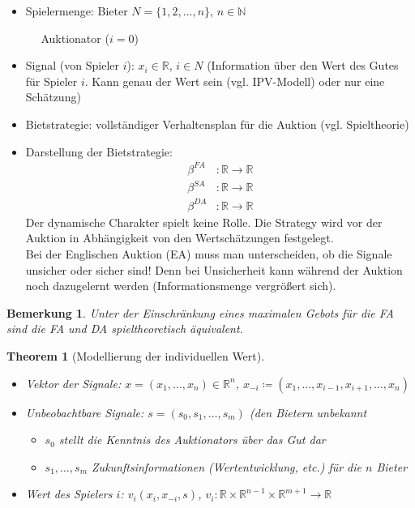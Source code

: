 \documentclass[12pt]{extreport} %
\theoremstyle{named}
\newtheorem{unnamedtheorem}{Theorem} \counterwithin{unnamedtheorem}{chapter}
\theoremstyle{nnamed}
\theoremstyle{itshape}
\theoremstyle{normal}
\newtheorem*{bemerkung}{Bemerkung}
\begin{document}
\begin{itemize}
	\item Spielermenge: Bieter $N = \{1, 2, \dotsc, n \}$, $n \in \mathbb{N}$
	
		~\hspace{2.3cm}~ Auktionator ($i = 0$)
	\item Signal (von Spieler $i$): $x_{i} \in \mathbb{R}$, $i \in N$ (Information über den Wert des Gutes für Spieler $i$. Kann genau der Wert sein (vgl. IPV-Modell) oder nur eine Schätzung)
	\item Bietstrategie: vollständiger Verhaltensplan für die Auktion (vgl. Spieltheorie)
	\item Darstellung der Bietstrategie:
		\begin{align*}
			\beta^{FA} & \colon \mathbb{R} \rightarrow \mathbb{R} \\
			\beta^{SA} & \colon \mathbb{R} \rightarrow \mathbb{R} \\
			\beta^{DA} & \colon \mathbb{R} \rightarrow \mathbb{R} 
		\end{align*}
		Der dynamische Charakter spielt keine Rolle. Die Strategy wird vor der Auktion in Abhängigkeit von den Wertschätzungen festgelegt. \\
		
		Bei der Englischen Auktion (EA) muss man unterscheiden, ob die Signale unsicher oder sicher sind! Denn bei Unsicherheit kann während der Auktion noch dazugelernt werden (Informationsmenge vergrößert sich).	
\end{itemize}

\begin{bemerkung}
	Unter der Einschränkung eines maximalen Gebots für die FA sind die FA und DA spieltheoretisch äquivalent.
\end{bemerkung}
\newpage
{}
\begin{unnamedtheorem}[Modellierung der individuellen Wert] ~\
	\begin{itemize}
		\item Vektor der Signale: $x = (x_1, \dotsc, x_{n}) \in \mathbb{R}^{n}$, $x_{-i} \coloneqq (x_1, \dotsc, x_{i-1}, x_{i+1}, \dotsc, x_{n})$
		\item Unbeobachtbare Signale: $s = (s_{0}, s_{1}, \dotsc, s_{m})$ (den Bietern unbekannt
			\begin{itemize}
				\item $s_0$ stellt die Kenntnis des Auktionators über das Gut dar
				\item $s_1, \dotsc, s_m$ Zukunftsinformationen (Wertentwicklung, etc.) für die $n$ Bieter
			\end{itemize}
		\item Wert des Spielers $i$: $v_{i}(x_{i}, x_{-i}, s)$, $v_{i} \colon \mathbb{R} \times \mathbb{R}^{n-1} \times \mathbb{R}^{m+1} \rightarrow \mathbb{R}$
	\end{itemize}
\end{unnamedtheorem}
\end{document}
